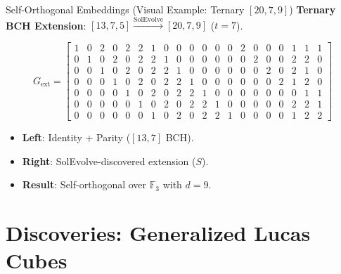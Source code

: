 \documentclass[10pt, aspectratio=169]{beamer}
\begin{document}
\begin{frame}{Self-Orthogonal Embeddings (Visual Example: Ternary $[20,7,9]$)}
    \textbf{Ternary BCH Extension}: $[13,7,5] \xrightarrow{\text{SolEvolve}} [20,7,9]$ ($t=7$).
    \vspace{0.2cm}
    
    \centering \tiny
    \[
    G_{\text{ext}} = \left[ \begin{array}{ccccccccccccc|ccccccc}
    1 & 0 & 2 & 0 & 2 & 2 & 1 & 0 & 0 & 0 & 0 & 0 & 0 & 2 & 0 & 0 & 0 & 1 & 1 & 1 \\
    0 & 1 & 0 & 2 & 0 & 2 & 2 & 1 & 0 & 0 & 0 & 0 & 0 & 0 & 2 & 0 & 0 & 2 & 2 & 0 \\
    0 & 0 & 1 & 0 & 2 & 0 & 2 & 2 & 1 & 0 & 0 & 0 & 0 & 0 & 0 & 2 & 0 & 2 & 1 & 0 \\
    0 & 0 & 0 & 1 & 0 & 2 & 0 & 2 & 2 & 1 & 0 & 0 & 0 & 0 & 0 & 0 & 2 & 1 & 2 & 0 \\
    0 & 0 & 0 & 0 & 1 & 0 & 2 & 0 & 2 & 2 & 1 & 0 & 0 & 0 & 0 & 0 & 0 & 0 & 1 & 1 \\
    0 & 0 & 0 & 0 & 0 & 1 & 0 & 2 & 0 & 2 & 2 & 1 & 0 & 0 & 0 & 0 & 0 & 2 & 2 & 1 \\
    0 & 0 & 0 & 0 & 0 & 0 & 1 & 0 & 2 & 0 & 2 & 2 & 1 & 0 & 0 & 0 & 0 & 1 & 2 & 2
    \end{array} \right]
    \]
    
    \vspace{0.2cm}
    \raggedright
    \footnotesize
    \begin{itemize}
        \item \textbf{Left}: Identity + Parity ($[13,7]$ BCH).
        \item \textbf{Right}: SolEvolve-discovered extension ($S$).
        \item \textbf{Result}: Self-orthogonal over $\mathbb{F}_3$ with $d=9$.
    \end{itemize}
\end{frame}

\section{Discoveries: Generalized Lucas Cubes}
\end{document}
